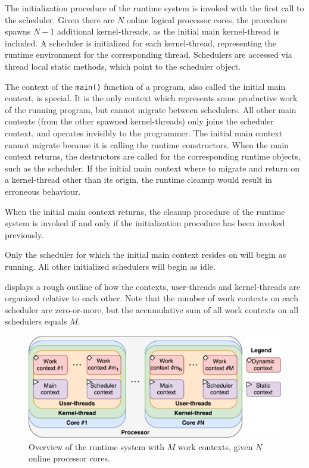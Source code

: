 The initialization procedure of the runtime system is invoked with the first call to the scheduler. Given there are $N$ online logical processor cores, the procedure spawns $N-1$ additional kernel\hyp{}threads, as the initial main kernel\hyp{}thread is included. A scheduler is initialized for each kernel\hyp{}thread, representing the runtime environment for the corresponding thread. Schedulers are accessed via thread local static methods, which point to the scheduler object.

The context of the \texttt{main()} function of a program, also called the initial main context, is special. It is the only context which represents some productive work of the running program, but cannot migrate between schedulers. All other main contexts (from the other spawned kernel\hyp{}threads) only joins the scheduler context, and operates invisibly to the programmer. The initial main context cannot migrate because it is calling the runtime constructors. When the main context returns, the destructors are called for the corresponding runtime objects, such as the scheduler. If the initial main context where to migrate and return on a kernel\hyp{}thread other than its origin, the runtime cleanup would result in erroneous behaviour.

When the initial main context returns, the cleanup procedure of the runtime system is invoked if and only if the initialization procedure has been invoked previously.

Only the scheduler for which the initial main context resides on will begin as running. All other initialized schedulers will begin as idle.

 displays a rough outline of how the contexts, user\hyp{}threads and kernel\hyp{}threads are organized relative to each other. Note that the number of work contexts on each scheduler are zero\hyp{}or\hyp{}more, but the accumulative sum of all work contexts on all schedulers equals $M$.

\begin{figure}[h!]
    \centering
    \includegraphics[width=0.9\linewidth]{fig/runtime_overview}
    \caption{Overview of the runtime system with $M$ work contexts, given $N$ online processor cores.}
    \label{fig:runtime_overview}
\end{figure}


